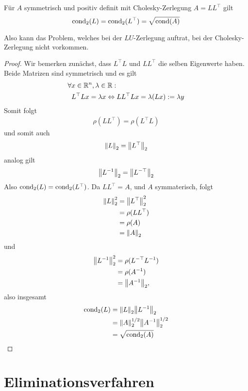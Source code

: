 \documentclass{report}
\begin{document}
\begin{theorem}
	Für $A$ symmetrisch und positiv definit mit Cholesky-Zerlegung $A = L L^\top$ gilt
	\begin{align*}
		\textnormal{cond}_2(L) = \textnormal{cond}_2(L^\top) = \sqrt{\textnormal{cond}(A)}
	\end{align*}
\end{theorem}
 \noindent Also kann das Problem, welches bei der $LU$-Zerlegung auftrat, bei der Cholesky-Zerlegung nicht vorkommen.
 \begin{proof}
 	Wir bemerken zunächst, dass $L^\top L$ und $LL^\top$ die selben Eigenwerte haben. Beide Matrizen sind symmetrisch und es gilt
 	\begin{align*}
 		\forall &x \in \mathbb{R}^n, \lambda \in \mathbb{R} : \\
 		&L^\top L x = \lambda x \Leftrightarrow  LL^\top Lx = \lambda(Lx) := \lambda y
 	\end{align*}
 	Somit folgt
 	\begin{align*}
 		\rho(LL^\top) = \rho(L^\top L)
 	\end{align*}
 	und somit auch
 	\begin{align*}
 		\norm{L}_2 = \norm{L^\top}_2
 	\end{align*}
 	analog gilt
 	\begin{align*}
 		\norm{L^{-1}}_2 = \norm{L^{-\top}}_2
 	\end{align*}
 	Also $\textnormal{cond}_2(L) = \textnormal{cond}_2(L^\top)$. Da $LL^\top = A$, und $A$ symmaterisch, folgt
 	\begin{align*}
 		\norm{L}_2^2 &= \norm{L^\top}_2^2\\
 					 &= \rho(LL^\top)\\
 					 &= \rho(A)\\ 
 					 &= \norm{A}_2
 	\end{align*}
 	und
 	\begin{align*}
 		\norm{L^{-1}}_2^2 &= \rho(L^{-\top}L^{-1})\\
 		 				  &= \rho(A^{-1})\\ 
 		 				  &= \norm{A^{-1}}_2,
 	\end{align*}
 	also insgesamt
 	\begin{align*}
 		\textnormal{cond}_2(L) &= \norm{L}_2\norm{L^{-1}}_2\\
 		           &= \norm{A}_2^{1/2} \norm{A^{-1}}_2^{1/2}\\ 
 		           &= \sqrt{\textnormal{cond}_2(A)}
 	\end{align*}
 \end{proof}
\chapter{Eliminationsverfahren}
\end{document}
